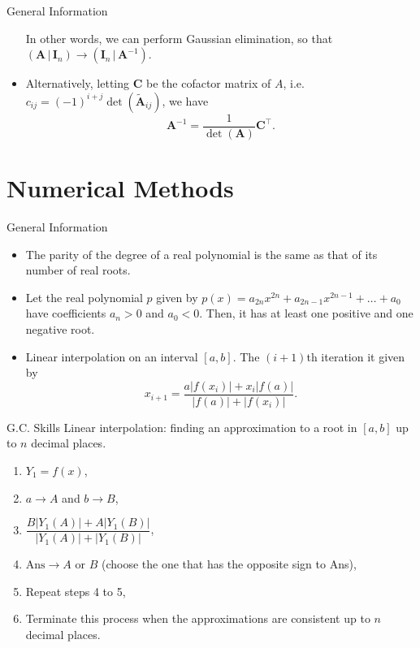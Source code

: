 \documentclass[../Notes.tex]{subfiles}
\begin{document}
\begin{stbox}{General Information}
\begin{itemize}
            In other words, we can perform Gaussian elimination, so that \((\mathbf{A} \,\vert\, \mathbf{I}_n)\to (\mathbf{I}_n \,\vert\, \mathbf{A}^{-1})\).
            \item Alternatively, letting \(\mathbf{C}\) be the cofactor matrix of \(A\), i.e. \(c_{ij}=(-1)^{i+j}\det(\widetilde{\mathbf{A}}_{ij})\), we have
            \[\mathbf{A}^{-1}=\frac{1}{\det(\mathbf{A})}\mathbf{C}^\top.\]
        \end{itemize}
    \end{stbox}
    
    \chapter{Numerical Methods}
    \begin{stbox}{General Information}
        \begin{itemize}
            \item The parity of the degree of a real polynomial is the same as that of its number of real roots.
            \item Let the real polynomial \(p\) given by \(p(x)=a_{2n}x^{2n}+a_{2n-1}x^{2n-1}+\dots+a_0\) have coefficients \(a_n>0\) and \(a_0<0\). Then, it has at least one positive and one negative root.
            \item Linear interpolation on an interval \([a,b]\). The \((i+1)\)th iteration it given by
            \[x_{i+1}=\frac{a \lvert f(x_i) \rvert+x_i \lvert f(a) \rvert}{\lvert f(a) \rvert+\lvert f(x_i) \rvert}.\]
        \end{itemize}
    \end{stbox}
    \begin{lbox}[colbacktitle=white, coltitle=black, colframe=black]{G.C. Skills} 
        Linear interpolation: finding an approximation to a root in \([a,b]\) up to \(n\) decimal places.
        \begin{enumerate}
          \item \(Y_1=f(x)\),
          \item \(a \to A\) and \(b \to B\),
          \item \(\dfrac{B \lvert Y_1(A) \rvert+A \lvert Y_1(B) \rvert}{\lvert Y_1(A) \rvert+\lvert Y_1(B) \rvert}\),
          \item \(\text{Ans}\to A \text{ or } B\) (choose the one that has the opposite sign to Ans),
          \item Repeat steps 4 to 5,
          \item Terminate this process when the approximations are consistent up to \(n\) decimal places.
        \end{enumerate}
      \end{lbox}
\end{document}
